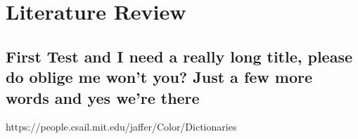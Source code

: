 
\chapter{Literature Review}
\label{section:litreview}
\section{First Test and I need a really long title, please do oblige me won't you? Just a few more words and yes we're there}



https://people.csail.mit.edu/jaffer/Color/Dictionaries
